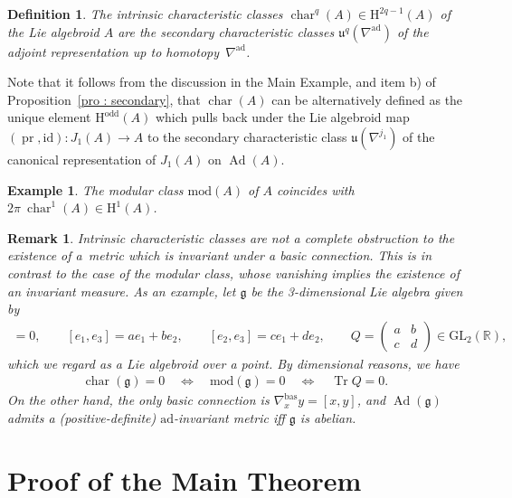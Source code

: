 \documentclass[11pt]{article}
\numberwithin{equation}{section}
\newcommand{\R}{\mathbb{R}}
\newcommand{\pr}{\operatorname{pr}}
\newcommand{\HH}{\mathrm{H}}
\newcommand{\id}{\mathrm{id}}
\newcommand{\8}{\infty}
\newtheorem*{defi}{Definition}}
\newtheorem*{example*}{Example}
\newtheorem*{remark*}{Remark}
\begin{document}
\begin{defi} The {\it intrinsic characteristic classes} $\operatorname{char}^q(A) \in \HH^{2q-1}(A)$ of the Lie algebroid $A$ are the secondary characteristic classes $\mathfrak{u}^q(\nabla^{\mathrm{ad}})$ of the adjoint representation up to homotopy~$\nabla^{\mathrm{ad}}$.
\end{defi}
Note that it follows from the discussion in the Main Example, and item b) of Proposition~\ref{pro : secondary}, that $\operatorname{char}(A)$ can be alternatively defined as the unique element $\HH^{\mathrm{odd}}(A)$ which pulls back under the Lie algebroid map $(\pr,\id)\colon J_1(A) \to A$ to the secondary characteristic class $\mathfrak{u}(\nabla^{j_1})$ of the canonical representation of $J_1(A)$ on $\operatorname{Ad}(A)$.

\begin{example*}The \emph{modular class} $\mathrm{mod}(A)$ of $A$ coincides with $2\pi\ \operatorname{char}^1(A) \in \HH^{1}(A)$.
\end{example*}

\begin{remark*} Intrinsic characteristic classes are not a complete obstruction to the existence of a~metric which is invariant under a basic connection. This is in contrast to the case of the modular class, whose vanishing implies the existence of an invariant measure. As an example, let $\mathfrak{g}$ be the 3-dimensional Lie algebra given by
 \begin{gather*}
 [e_1,e_2] = 0, \qquad [e_1,e_3] = ae_1+be_2, \qquad [e_2,e_3] = ce_1+de_2, \qquad Q = \left( \begin{matrix}
 a & b\\
 c & d
 \end{matrix}
 \right) \in \mathrm{GL}_2(\R),
 \end{gather*}which we regard as a Lie algebroid over a point. By dimensional reasons, we have
 \begin{gather*}
 \operatorname{char}(\mathfrak{g}) = 0 \quad \Longleftrightarrow \quad \mathrm{mod}(\mathfrak{g})=0 \quad \Longleftrightarrow \quad \operatorname{Tr} Q=0.
 \end{gather*}On the other hand, the only basic connection is $\nabla^{\mathrm{bas}}_xy = [x,y]$, and $\operatorname{Ad}(\mathfrak{g})$ admits a (positive-definite) $\mathrm{ad}$-invariant metric iff $\mathfrak{g}$ is abelian.
\end{remark*}

\section{Proof of the Main Theorem}\label{section3}
\end{document}
